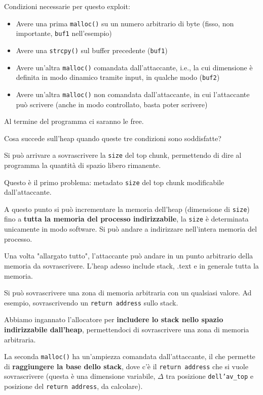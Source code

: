 Condizioni necessarie per questo exploit:
\begin{itemize}
	\item Avere una prima \texttt{malloc()} su un numero arbitrario di byte (fisso, non importante, \texttt{buf1} nell'esempio)
    
	\item Avere una \texttt{strcpy()} sul buffer precedente (\texttt{buf1})
    
	\item Avere un'altra \texttt{malloc()} comandata dall'attaccante, i.e., la cui dimensione è definita in modo dinamico tramite input, in qualche modo (\texttt{buf2})
    
	\item Avere un'altra \texttt{malloc()} non comandata dall'attaccante, in cui l'attaccante può scrivere (anche in modo controllato, basta poter scrivere)
\end{itemize}
Al termine del programma ci saranno le free.

Cosa succede sull'heap quando queste tre condizioni sono soddisfatte?
\begin{center}
    
\end{center}

Si può arrivare a sovrascrivere la \texttt{size} del top chunk, permettendo di dire al programma la quantità di spazio libero rimanente. 

Questo è il primo problema: metadato \texttt{size} del top chunk modificabile dall'attaccante. 

A questo punto si può incrementare la memoria dell'heap (dimensione di \texttt{size}) fino a \textbf{tutta la memoria del processo indirizzabile}, la \texttt{size} è determinata unicamente in modo software. Si può andare a indirizzare nell'intera memoria del processo.

Una volta "allargato tutto", l'attaccante può andare in un punto arbitrario della memoria da sovrascrivere. L'heap adesso include stack, .text e in generale tutta la memoria. 

Si può sovrascrivere una zona di memoria arbitraria con un qualsiasi valore. Ad esempio, sovrascrivendo un \texttt{return address} sullo stack.

Abbiamo ingannato l'allocatore per \textbf{includere lo stack nello spazio indirizzabile dall'heap}, permettendoci di sovrascrivere una zona di memoria arbitraria.

La seconda \texttt{malloc()} ha un'ampiezza comandata dall'attaccante, il che permette di \textbf{raggiungere la base dello stack}, dove c'è il \texttt{return address} che si vuole sovrascrivere (questa è una dimensione variabile, $\Delta$ tra posizione \texttt{dell'av\_top} e posizione del \texttt{return address}, da calcolare).

